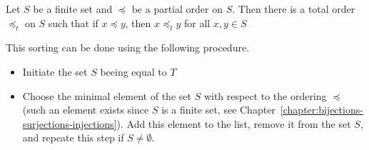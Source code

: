 \begin{theorem}
\label{theorem:topological-order}
  Let $S$ be a finite set and $\preceq$ be a partial order on $S$. Then there is
  a total order $\preceq_t$ on $S$ such that if $x \preceq y$, then
  $x \preceq_t y$ for all $x, y \in S$
\end{theorem}

This sorting can be done using the following procedure.
\begin{itemize}
  \item Initiate the set $S$ beeing equal to $T$
  \item Choose the minimal element of the set $S$ with respect to the ordering
    $\preceq$ (such an element exists since $S$ is a finite set, see
    Chapter~\ref{chapter:bijections-surjections-injections}).
    Add this element to the list, remove it from the set $S$, and repeate this
    step if $S \neq \emptyset$.
\end{itemize}

